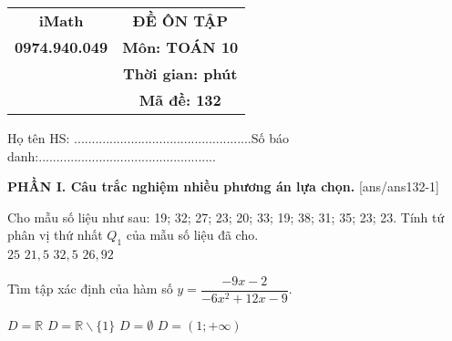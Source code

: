 \documentclass[12pt,a4paper]{article}
\begin{document}





\begin{tabular}{cc}
{\bf iMath} & {\bf ĐỀ ÔN TẬP}\\ 
{\bf 0974.940.049} & {\bf Môn: TOÁN 10}\\  
& {\bf Thời gian:  phút}\\ 
& {\bf Mã đề: 132}\\ 
\end{tabular}

{Họ tên HS: ..................................................Số báo danh:..................................................}


{\bf PHẦN I. Câu trắc nghiệm nhiều phương án lựa chọn.}
\setcounter{ex}{0}
[ans/ans132-1]
\begin{ex}
 Cho mẫu số liệu như sau: 19; 32; 27; 23; 20; 33; 19; 38; 31; 35; 23; 23. Tính tứ phân vị thứ nhất $Q_1$ của mẫu số liệu đã cho.\\ 
\choice
{ ${25}$ }
   { \True ${21,5}$ }
     { ${32,5}$ }
    { ${26,92}$ }
\loigiai{ 
  
 }\end{ex}

\begin{ex}
 Tìm tập xác định của hàm số $y=\dfrac{- 9 x - 2}{- 6 x^{2} + 12 x - 9}$.

\choice
{ \True ${D=\mathbb{R}}$ }
   { ${D=\mathbb{R} \backslash \{1\}}$ }
     { ${D=\emptyset}$ }
    { ${D=\left(1;+\infty\right)}$ }
\end{ex}
\end{document}
